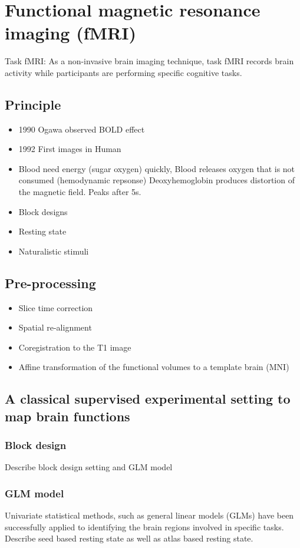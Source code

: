 \section{Functional magnetic resonance imaging (fMRI)}
Task fMRI:
As a non-invasive brain imaging technique, task fMRI records brain
activity while participants are
performing specific cognitive tasks.

\subsection{Principle}
\begin{itemize}
\item 1990 Ogawa observed BOLD effect
\item 1992 First images in Human
  \item Blood need energy (sugar oxygen) quickly, Blood releases oxygen that is
    not consumed (hemodynamic repsonse) Deoxyhemoglobin produces distortion of
    the magnetic field. Peaks after 5s.
  \item Block designs
  \item Resting state
    \item Naturalistic stimuli
\end{itemize}
\subsection{Pre-processing}
\begin{itemize}
\item Slice time correction
\item Spatial re-alignment
\item Coregistration to the T1 image
\item Affine transformation of the functional volumes to a template brain (MNI)
\end{itemize}
\subsection{A classical supervised experimental setting to map brain functions}
\subsubsection{Block design}
Describe block design setting and GLM model
\subsubsection{GLM model}
Univariate statistical methods, such as general linear models (GLMs)
\cite{friston1995analysis} have been successfully applied to
identifying the brain regions involved in specific tasks.
% 
Describe seed based resting state as well as atlas based resting state.

